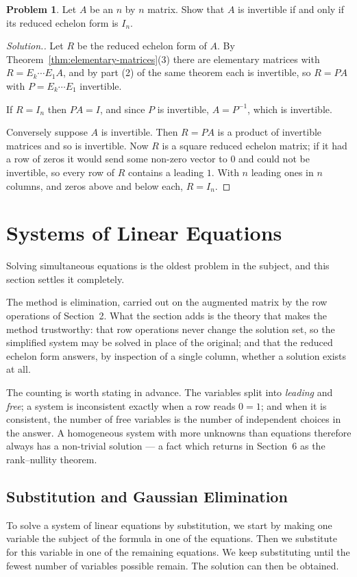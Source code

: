 \documentclass[11pt,a4paper]{article}
\theoremstyle{definition}
\newtheorem{problemx}{Problem}[section]
\newenvironment{problem}{\begin{problemx}}{\end{problemx}}
\newenvironment{solution}
  {\renewcommand{\qedsymbol}{}\begin{proof}[\textit{Solution}.]}
  {\end{proof}}
\begin{document}
\begin{problem}
Let $A$ be an $n$ by $n$ matrix. Show that $A$ is invertible if and only if its
reduced echelon form is $I_n$.
\end{problem}
\begin{solution}
Let $R$ be the reduced echelon form of $A$. By
Theorem~\ref{thm:elementary-matrices}(3) there are elementary matrices with
$R=E_k\cdots E_1A$, and by part (2) of the same theorem each is invertible, so
$R=PA$ with $P=E_k\cdots E_1$ invertible.

If $R=I_n$ then $PA=I$, and since $P$ is invertible, $A=P^{-1}$, which is
invertible.

Conversely suppose $A$ is invertible. Then $R=PA$ is a product of invertible
matrices and so is invertible. Now $R$ is a square reduced echelon matrix; if
it had a row of zeros it would send some non-zero vector to $0$ and could not
be invertible, so every row of $R$ contains a leading $1$. With $n$ leading
ones in $n$ columns, and zeros above and below each, $R=I_n$.
\end{solution}

\pagebreak
\section{Systems of Linear Equations}
Solving simultaneous equations is the oldest problem in the subject, and this
section settles it completely.

The method is elimination, carried out on the augmented matrix by the row
operations of Section~2. What the section adds is the theory that makes the
method trustworthy: that row operations never change the solution set, so the
simplified system may be solved in place of the original; and that the reduced
echelon form answers, by inspection of a single column, whether a solution
exists at all.

The counting is worth stating in advance. The variables split into
\emph{leading} and \emph{free}; a system is inconsistent exactly when a row
reads $0=1$; and when it is consistent, the number of free variables is the
number of independent choices in the answer. A homogeneous system with more
unknowns than equations therefore always has a non-trivial solution --- a fact
which returns in Section~6 as the rank--nullity theorem.



\subsection{Substitution and Gaussian Elimination}
To solve a system of linear equations by substitution, we start by making one variable the subject of the formula in one of the equations. Then we substitute for this variable in one of the remaining equations. We keep substituting until the fewest number of variables possible remain. The solution can then be obtained.
\end{document}
